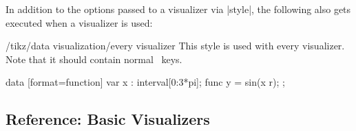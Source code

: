 In addition to the options passed to a visualizer via |style|, the
following also gets executed when a visualizer is used:

\begin{stylekey}{/tikz/data visualization/every visualizer}
  This style is used with every visualizer. Note that it should
  contain normal \tikzname\ keys.

\begin{codeexample}[width=7cm]
\tikz \datavisualization
 [scientific clean axes,
  every visualizer/.style={dashed},
  visualize as smooth line]
data [format=function] {
  var x : interval[0:3*pi];
  func y = sin(\value x r);
};
\end{codeexample}
\end{stylekey}


\subsection{Reference: Basic Visualizers}

